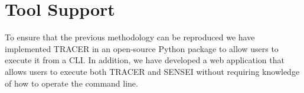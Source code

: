
\chapter{Tool Support}\label{chapter:tool_support}

To ensure that the previous methodology can be reproduced
we have implemented \acf{TRACER} in an open-source Python package
to allow users to execute it from a \ac{CLI}.
In addition, we have developed a web application
that allows users to execute both \ac{TRACER} and SENSEI
without requiring knowledge of how to operate the command line.











